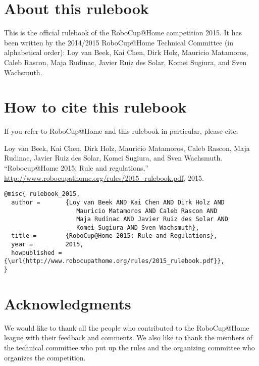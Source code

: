


\section*{About this rulebook}
This is the official rulebook of the RoboCup@Home competition 2015.
It has been written by the 2014/2015 RoboCup@Home Technical Committee (in alphabetical order): 
Loy van Beek, 
Kai Chen, 
Dirk Holz,  
Mauricio Matamoros, 
Caleb Rascon, 
Maja Rudinac, 
Javier Ruiz des Solar, 
Komei Sugiura, and 
Sven Wachsmuth.

\section*{How to cite this rulebook}
If you refer to RoboCup@Home and this rulebook in particular, please cite:

Loy van Beek, Kai Chen, Dirk Holz, Mauricio Matamoros, Caleb Rascon, Maja Rudinac, Javier Ruiz des Solar, Komei Sugiura, and Sven Wachsmuth. 
``Robocup@Home 2015: Rule and regulations,'' 
\url{http://www.robocupathome.org/rules/2015_rulebook.pdf}, 2015.

\begin{verbatim}
@misc{ rulebook_2015,
  author =       {Loy van Beek AND Kai Chen AND Dirk Holz AND
  					Mauricio Matamoros AND Caleb Rascon AND
  					Maja Rudinac AND Javier Ruiz des Solar AND
  					Komei Sugiura AND Sven Wachsmuth},
  title =        {RoboCup@Home 2015: Rule and Regulations},
  year =         2015,
  howpublished = {\url{http://www.robocupathome.org/rules/2015_rulebook.pdf}},
}
\end{verbatim}

\section*{Acknowledgments}
\label{sec:acknowledgments}


We would like to thank all the people who contributed to the RoboCup@Home league 
with their feedback and comments. 
We also like to thank the members of the technical committee who put up the rules
and the organizing committee who organizes the competition.  

